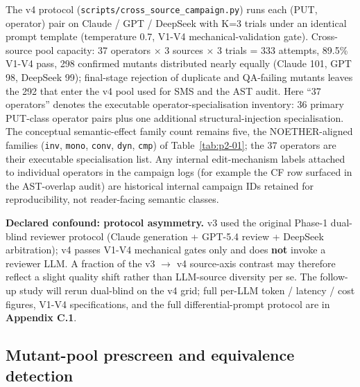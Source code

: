\documentclass[manuscript,screen,review]{acmart}
\begin{document}
The v4 protocol (\texttt{scripts/cross\_source\_campaign.py}) runs each
(PUT, operator) pair on Claude / GPT / DeepSeek with K=3 trials under an
identical prompt template (temperature 0.7, V1-V4 mechanical-validation
gate). Cross-source pool capacity: 37 operators $\times$ 3 sources $\times$ 3 trials =
333 attempts, 89.5\% V1-V4 pass, 298 confirmed mutants distributed nearly
equally (Claude 101, GPT 98, DeepSeek 99); final-stage rejection of
duplicate and QA-failing mutants leaves the 292 that enter the v4 pool
used for SMS and the AST audit.
Here ``37 operators'' denotes the executable operator-specialisation
inventory: 36 primary PUT-class operator pairs plus one additional
structural-injection specialisation. The conceptual semantic-effect
family count remains five, the NOETHER-aligned families (\texttt{inv},
\texttt{mono}, \texttt{conv}, \texttt{dyn}, \texttt{cmp}) of
Table~\ref{tab:p2-01}; the 37 operators are their executable
specialisation list. Any internal edit-mechanism labels attached to
individual operators in the campaign logs (for example the CF row
surfaced in the AST-overlap audit) are historical internal campaign IDs
retained for reproducibility, not reader-facing semantic classes.

\textbf{Declared confound: protocol asymmetry.} v3 used the
original Phase-1 dual-blind reviewer protocol (Claude generation +
GPT-5.4 review + DeepSeek arbitration); v4 passes V1-V4 mechanical gates
only and does \textbf{not} invoke a reviewer LLM. A fraction of the v3 $\to$
v4 source-axis contrast may therefore reflect a slight quality shift
rather than LLM-source diversity per se. The follow-up study will rerun
dual-blind on the v4 grid; full per-LLM token / latency / cost figures,
V1-V4 specifications, and the full differential-prompt protocol are in
\textbf{Appendix C.1}.

\subsection{Mutant-pool prescreen and equivalence detection}\label{mutant-pool-prescreen-and-equivalence-detection}
\end{document}

